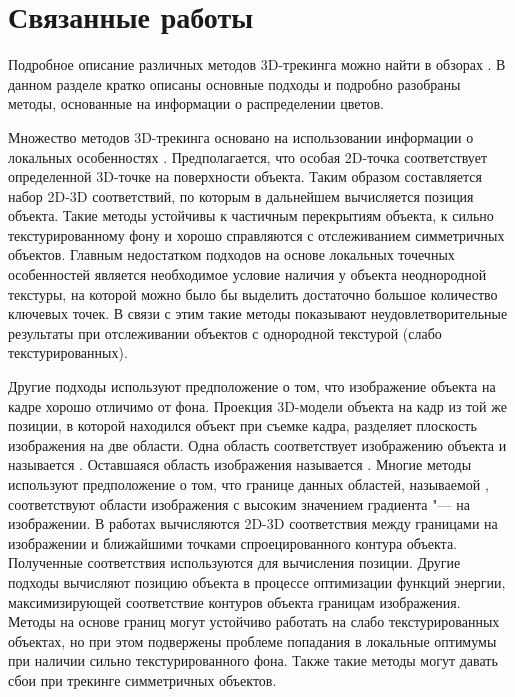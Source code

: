 \section{Связанные работы}\label{related-work}

Подробное описание различных методов 3D-трекинга можно найти в обзорах
\cite{LepetitSurvey,MarchandSurvey}.
В данном разделе кратко описаны основные подходы и подробно разобраны методы,
основанные на информации о распределении цветов.

Множество методов 3D-трекинга
\cite{Hinterstoisser2007,Vacchetti2004,Lourakis2013,Pauwels2013}
основано на использовании информации о локальных
особенностях \cite{AKAZE,SIFT,ShiAndTomasi,TomasiAndKanade,SIFT,PyrLK}.
Предполагается, что особая 2D-точка соответствует определенной
3D-точке на поверхности объекта.
Таким образом составляется набор 2D-3D соответствий, по которым в дальнейшем
вычисляется позиция объекта\cite{EPnP}.
Такие методы устойчивы к частичным перекрытиям объекта, к сильно
текстурированному фону и хорошо справляются с отслеживанием симметричных
объектов.
Главным недостатком подходов на основе локальных точечных особенностей является
необходимое условие наличия у объекта неоднородной текстуры, на которой можно
было бы выделить достаточно большое количество ключевых точек.
В связи с этим такие методы показывают неудовлетворительные результаты при
отслеживании объектов с однородной текстурой (слабо текстурированных).

Другие подходы используют предположение о том, что изображение объекта на кадре
хорошо отличимо от фона.
Проекция 3D-модели объекта на кадр из той же позиции, в которой находился
объект при съемке кадра, разделяет плоскость изображения на две области.
Одна область соответствует изображению объекта и называется .
Оставшаяся область изображения называется .
Многие методы используют предположение о том, что границе данных областей,
называемой , соответствуют области изображения с высоким
значением градиента "---  на изображении\cite{EdgesSurvey,CANNY}.
В работах
\cite{RAPID,Marchand2003,Choi2012,Marchand2006,Klein2006,SeoHinterstoisser2014,WangZhong2015,Damen2012,VacchettiEdges2004}
вычисляются 2D-3D соответствия между границами на изображении и ближайшими
точками спроецированного контура объекта.
Полученные соответствия используются для вычисления позиции.
Другие подходы \cite{WangZhong2017,Marchand2001,Bugaev_2018_ECCV} вычисляют
позицию объекта в процессе оптимизации функций энергии, максимизирующей
соответствие контуров объекта границам изображения.
Методы на основе границ могут устойчиво работать на слабо текстурированных
объектах, но при этом подвержены проблеме попадания в локальные оптимумы
при наличии сильно текстурированного фона.
Также такие методы могут давать сбои при трекинге симметричных объектов.

